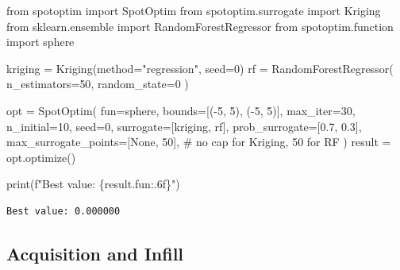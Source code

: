 \documentclass[
  twocolumn]{article}
\newenvironment{Shaded}{\begin{snugshade}}{\end{snugshade}}
\newcommand{\BuiltInTok}[1]{\textcolor[rgb]{0.00,0.23,0.31}{#1}}
\newcommand{\CommentTok}[1]{\textcolor[rgb]{0.37,0.37,0.37}{#1}}
\newcommand{\DecValTok}[1]{\textcolor[rgb]{0.68,0.00,0.00}{#1}}
\newcommand{\FloatTok}[1]{\textcolor[rgb]{0.68,0.00,0.00}{#1}}
\newcommand{\ImportTok}[1]{\textcolor[rgb]{0.00,0.46,0.62}{#1}}
\newcommand{\NormalTok}[1]{\textcolor[rgb]{0.00,0.23,0.31}{#1}}
\newcommand{\OperatorTok}[1]{\textcolor[rgb]{0.37,0.37,0.37}{#1}}
\newcommand{\SpecialCharTok}[1]{\textcolor[rgb]{0.37,0.37,0.37}{#1}}
\newcommand{\SpecialStringTok}[1]{\textcolor[rgb]{0.13,0.47,0.30}{#1}}
\newcommand{\StringTok}[1]{\textcolor[rgb]{0.13,0.47,0.30}{#1}}
\newcommand{\VariableTok}[1]{\textcolor[rgb]{0.07,0.07,0.07}{#1}}
\begin{document}
\begin{Shaded}
\begin{Highlighting}[]
\ImportTok{from}\NormalTok{ spotoptim }\ImportTok{import}\NormalTok{ SpotOptim}
\ImportTok{from}\NormalTok{ spotoptim.surrogate }\ImportTok{import}\NormalTok{ Kriging}
\ImportTok{from}\NormalTok{ sklearn.ensemble }\ImportTok{import}\NormalTok{ RandomForestRegressor}
\ImportTok{from}\NormalTok{ spotoptim.function }\ImportTok{import}\NormalTok{ sphere}

\NormalTok{kriging }\OperatorTok{=}\NormalTok{ Kriging(method}\OperatorTok{=}\StringTok{"regression"}\NormalTok{, seed}\OperatorTok{=}\DecValTok{0}\NormalTok{)}
\NormalTok{rf }\OperatorTok{=}\NormalTok{ RandomForestRegressor(}
\NormalTok{    n\_estimators}\OperatorTok{=}\DecValTok{50}\NormalTok{, random\_state}\OperatorTok{=}\DecValTok{0}
\NormalTok{)}

\NormalTok{opt }\OperatorTok{=}\NormalTok{ SpotOptim(}
\NormalTok{    fun}\OperatorTok{=}\NormalTok{sphere,}
\NormalTok{    bounds}\OperatorTok{=}\NormalTok{[(}\OperatorTok{{-}}\DecValTok{5}\NormalTok{, }\DecValTok{5}\NormalTok{), (}\OperatorTok{{-}}\DecValTok{5}\NormalTok{, }\DecValTok{5}\NormalTok{)],}
\NormalTok{    max\_iter}\OperatorTok{=}\DecValTok{30}\NormalTok{,}
\NormalTok{    n\_initial}\OperatorTok{=}\DecValTok{10}\NormalTok{,}
\NormalTok{    seed}\OperatorTok{=}\DecValTok{0}\NormalTok{,}
\NormalTok{    surrogate}\OperatorTok{=}\NormalTok{[kriging, rf],}
\NormalTok{    prob\_surrogate}\OperatorTok{=}\NormalTok{[}\FloatTok{0.7}\NormalTok{, }\FloatTok{0.3}\NormalTok{],}
\NormalTok{    max\_surrogate\_points}\OperatorTok{=}\NormalTok{[}\VariableTok{None}\NormalTok{, }\DecValTok{50}\NormalTok{],}
    \CommentTok{\# no cap for Kriging, 50 for RF}
\NormalTok{)}
\NormalTok{result }\OperatorTok{=}\NormalTok{ opt.optimize()}

\BuiltInTok{print}\NormalTok{(}\SpecialStringTok{f"Best value: }\SpecialCharTok{\{}\NormalTok{result}\SpecialCharTok{.}\NormalTok{fun}\SpecialCharTok{:.6f\}}\SpecialStringTok{"}\NormalTok{)}
\end{Highlighting}
\end{Shaded}

\begin{verbatim}
Best value: 0.000000
\end{verbatim}

\subsection{Acquisition and Infill}\label{sec-optimizer}
\end{document}
